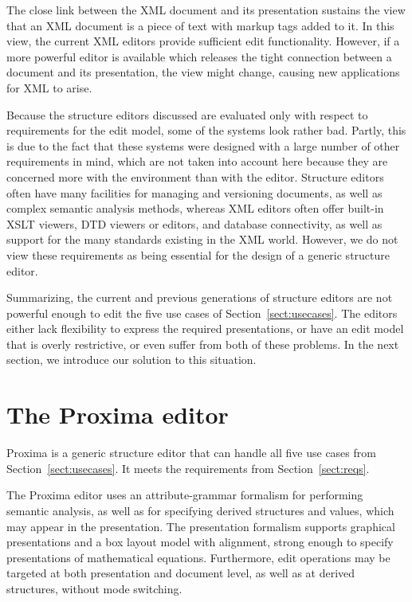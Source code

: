 The close link between the XML document and its presentation sustains the view that an XML document is a piece of text with markup tags added to it. In this view, the current XML editors provide sufficient edit functionality. However, if a more powerful editor is available which releases the tight connection between a document and its presentation, the view might change, causing new applications for XML to arise.


\bigskip

Because the structure editors discussed are evaluated only with respect to requirements for the edit model, some of the systems look rather bad. Partly, this is due to the fact that these systems were designed with a large number of other requirements in mind, which are not taken into account here because they are concerned more with the environment than with the editor. Structure editors often have many facilities for managing and versioning documents, as well as complex semantic analysis methods, whereas XML editors often offer built-in XSLT viewers, DTD viewers or editors, and database connectivity, as well as support for the many standards existing in the XML world. However, we do not view these requirements as being essential for the design of a generic structure editor.

Summarizing, the current and previous generations of structure editors are not powerful enough to edit the five use cases of Section~\ref{sect:usecases}. The editors either lack flexibility to express the required presentations, or have an edit model that is overly restrictive, or even suffer from both of these problems. In the next section, we introduce our solution to this situation.

\section{The Proxima editor}\label{sect:proxEditor}

Proxima is a generic structure editor that can handle all five use cases from Section~\ref{sect:usecases}. It meets the requirements from Section~\ref{sect:reqs}.

The Proxima editor uses an attribute-grammar formalism for performing semantic analysis, as well as for specifying derived structures and values, which may appear in the presentation. The presentation formalism supports graphical presentations and a box layout model with alignment, strong enough to specify presentations of mathematical equations. Furthermore, edit operations may be targeted at both presentation and document level, as well as at derived structures, without mode switching.

